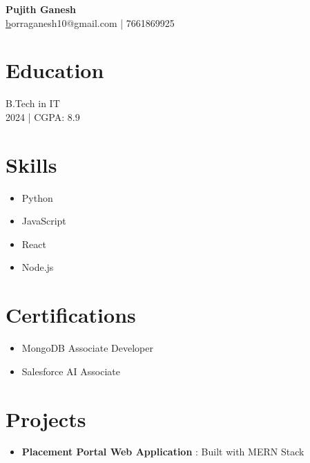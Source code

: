 \documentclass{article}
\begin{document}
\begin{center}
    {\LARGE \textbf{ Pujith Ganesh }} \\
    \href{mailto:borraganesh10@gmail.com}borraganesh10@gmail.com | 7661869925
\end{center}

\vspace{0.3cm}

\section*{Education}
B.Tech in IT \\
2024 | CGPA: 8.9


\section*{Skills}
\begin{itemize}[leftmargin=*]
    
        \item Python
    
        \item JavaScript
    
        \item React
    
        \item Node.js
    
\end{itemize}



\section*{Certifications}
\begin{itemize}[leftmargin=*]
    
        \item MongoDB Associate Developer
    
        \item Salesforce AI Associate
    
\end{itemize}



\section*{Projects}
\begin{itemize}[leftmargin=*]
    
        \item \textbf{ Placement Portal Web Application }: Built with MERN Stack
    
\end{itemize}
\end{document}
